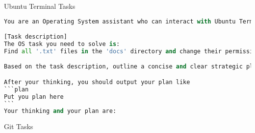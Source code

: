 
Ubuntu Terminal Tasks

\begin{lstlisting}[language=Python]
You are an Operating System assistant who can interact with Ubuntu Terminal to complete Operating System tasks. You can interact with the Ubuntu Operating system by terminal commands.

[Task description]
The OS task you need to solve is:
Find all '.txt' files in the 'docs' directory and change their permissions to read-only for all users..

Based on the task description, outline a concise and clear strategic plan that divides the task into subtasks. Your plan should be detailed and actionable, thus guiding yourself to complete the task efficiently.

After your thinking, you should output your plan like
```plan
Put you plan here
```
Your thinking and your plan are:

\end{lstlisting}


Git Tasks

